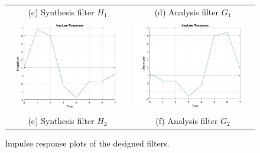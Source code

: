 \begin{figure}[htpb]
\begin{tabular}{cc}
(c) Synthesis filter $H_1$  & (d) Analysis filter $G_1$  \\ [8pt]
\includegraphics[width=75mm]{H2_Response.jpg} & \includegraphics[width=75mm]{G2_Response.jpg} \\
(e) Synthesis filter $H_2$ & (f) Analysis filter $G_2$\\[8pt]
\end{tabular}
\caption{Impulse response plots of the designed filters.}
\label{imp_resp}
\end{figure}

